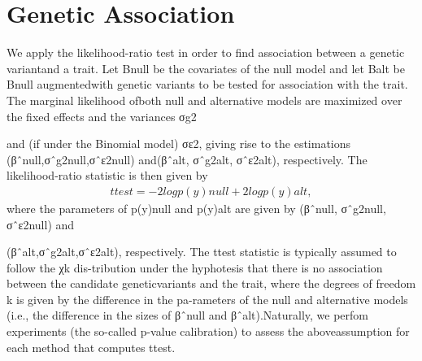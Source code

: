 \section{Genetic Association}

We apply the likelihood-ratio test in order to find association between a genetic variantand a trait. Let Bnull be the covariates of the null model and let Balt be Bnull augmentedwith genetic variants to be tested for association with the trait. The marginal likelihood ofboth null and alternative models are maximized over the fixed effects and the variances σg2

and (if under the Binomial model) σε2, giving rise to the estimations (βˆnull,σˆg2null,σˆε2null) and(βˆalt, σˆg2alt, σˆε2alt), respectively. The likelihood-ratio statistic is then given by
\begin{align*}
ttest = −2 log p(y)null + 2 log p(y)alt,
\end{align*}
where the parameters of p(y)null and p(y)alt are given by (βˆnull, σˆg2null, σˆε2null) and

(βˆalt,σˆg2alt,σˆε2alt),
respectively. The ttest statistic is typically assumed to follow the χk dis-tribution under the hyphotesis that there is no association between the candidate geneticvariants and the trait, where the degrees of freedom k is given by the difference in the pa-rameters of the null and alternative models (i.e., the difference in the sizes of βˆnull and βˆalt).Naturally, we perfom experiments (the so-called p-value calibration) to assess the aboveassumption for each method that computes ttest.
